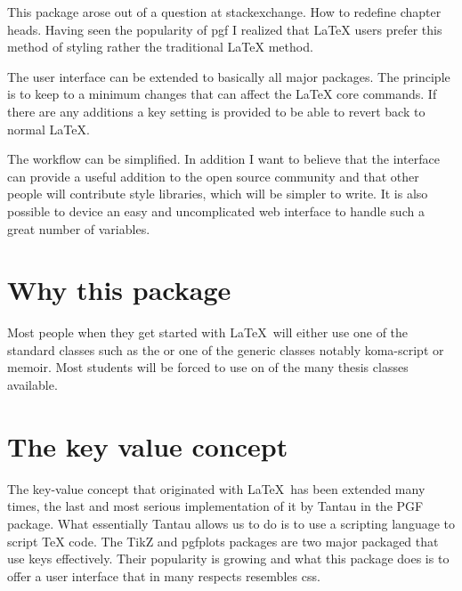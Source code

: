 This package arose out of a question at stackexchange. How to redefine chapter heads. Having seen the popularity of pgf I realized that LaTeX users prefer this method of styling rather the traditional LaTeX method.

The user interface can be extended to basically all major packages. The principle is to keep to a minimum changes that can affect the LaTeX core commands. If there are any additions a key setting is provided to be able to revert back to normal LaTeX.

The workflow can be simplified. In addition I want to believe that the interface can provide a useful addition to the open source community and that other people will contribute style libraries, which will be simpler to write. It is also possible
to device an easy and uncomplicated web interface to handle
such a great number of variables.

\section{Why this package}

Most people when they get started with \LaTeX\ will either use one of the standard classes such as the  or one of the generic classes notably koma-script or memoir. Most students will be forced to use on of the many thesis classes available.

\section{The key value concept}

The key-value concept that originated with \LaTeX\ has been extended many times, the last and most serious implementation of it by Tantau in the PGF package. What essentially Tantau allows us to do is to use a scripting language to script TeX code. The TikZ and pgfplots packages are two major packaged that use keys effectively. Their popularity is growing and what this package does is to offer a user interface that in many respects resembles css.

